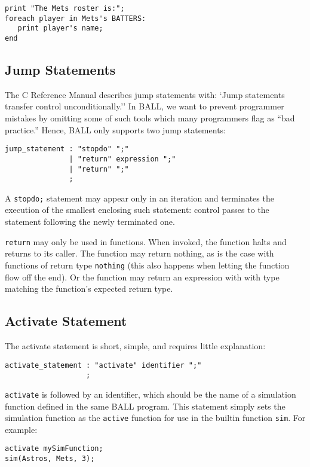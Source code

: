 \begin{verbatim}
print "The Mets roster is:";
foreach player in Mets's BATTERS:
   print player's name;
end
\end{verbatim}
 
 \subsection{Jump Statements}
The C Reference Manual describes jump statements with: `Jump
statements transfer control unconditionally.'' In BALL, we want to
prevent programmer mistakes by omitting some of such tools which many
programmers flag as ``bad practice.'' Hence, BALL only supports two
jump statements:

\begin{verbatim}
jump_statement : "stopdo" ";"
               | "return" expression ";"
               | "return" ";"
               ;
\end{verbatim}

A \texttt{stopdo;} statement may appear only in an iteration and
terminates the execution of the smallest enclosing such statement:
control passes to the statement following the newly terminated one.

\texttt{return} may only be used in functions. When invoked, the
function halts and returns to its caller. The function may return
nothing, as is the case with functions of return type \texttt{nothing}
(this also happens when letting the function flow off the end). Or the
function may return an expression with with type matching the
function's expected return type.

\subsection{Activate Statement}\label{activateStmt}
The activate statement is short, simple, and requires little explanation:

\begin{verbatim}
activate_statement : "activate" identifier ";"
                   ;
\end{verbatim}

\texttt{activate} is followed by an identifier, which should be the name of a
simulation function defined in the same BALL program. This statement
simply sets the simulation function as the \texttt{active} function for use
in the builtin function \texttt{sim}. For example:

\begin{verbatim}
activate mySimFunction;
sim(Astros, Mets, 3);
\end{verbatim}

